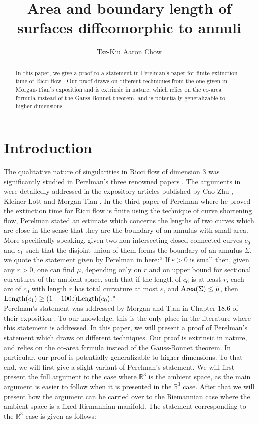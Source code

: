 \documentclass[a4paper, reqno]{amsart}
\title[Area and boundary length of annuli]{Area and boundary length of surfaces diffeomorphic to annuli}
\author{Tsz-Kiu Aaron Chow}
\theoremstyle{definition}
\theoremstyle{remark}
\numberwithin{equation}{section}
\newcommand{\Len}{\textup{Length}}
\numberwithin{equation}{section}
\numberwithin{equation}{section}
\begin{document}
\maketitle

\begin{abstract}
In this paper, we give a proof to a statement in Perelman's paper for finite extinction time of Ricci flow \cite{PL3}. Our proof draws on different techniques from the one given in Morgan-Tian's exposition \cite{MT} and is extrinsic in nature, which relies on the co-area formula instead of the Gauss-Bonnet theorem, and is potentially generalizable to higher dimensions.
\end{abstract}



\section{Introduction}

The qualitative nature of singularities in Ricci flow of dimension 3 was significantly studied in Perelman's three renowned papers \cite{PL1, PL2, PL3}. The arguments in \cite{PL1, PL2, PL3} were detailedly addressed in the expository articles published by Cao-Zhu \cite{CZ}, Kleiner-Lott \cite{KL} and Morgan-Tian \cite{MT}. In the third paper of Perelman \cite{PL3} where he proved the extinction time for Ricci flow is finite using the technique of curve shortening flow, Perelman stated an estimate which concerns the lengths of two curves which are close in the sense that they are the boundary of an annulus with small area. More specifically speaking, given two non-intersecting closed connected curves $c_0$ and $c_1$ such that the disjoint union of them forms the boundary of an annulus $\Sigma$, we quote the statement given by Perelman in \cite{PL3} here:`` If $\varepsilon > 0$ is small then, given any $r>0$, one can find $\bar{\mu}$, depending only on $r$ and on upper bound for sectional curvatures of the ambient space, such that if the length of $c_0$ is at least $r$, each arc of $c_0$ with length $r$ has total curvature at most $\varepsilon$, and $\textup{Area}(\Sigma)\leq\bar{\mu}$, then $\Len(c_1)\geq (1 - 100\varepsilon)\Len(c_0)$."\\

Perelman's statement was addressed by Morgan and Tian in Chapter 18.6 of their exposition \cite{MT}. To our knowledge, this is the only place in the literature where this statement is addressed. In this paper, we will present a proof of Perelman's statement which draws on different techniques. Our proof is extrinsic in nature, and relies on the co-area formula instead of the Gauss-Bonnet theorem. In particular, our proof is potentially generalizable to higher dimensions. To that end, we will first give a slight variant of Perelman's statement. We will first present the full argument to the case where $\mathbb{R}^3$ is the ambient space, as the main argument is easier to follow when it is presented in the $\mathbb{R}^3$ case. After that we will present how the argument can be carried over to the Riemannian case where the ambient space is a fixed Riemannian manifold. The statement corresponding to the $\mathbb{R}^3$ case is given as follows:
\end{document}
